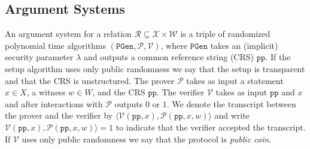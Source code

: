 \documentclass[11pt, lettersize, notitlepage, leqno, footskip=0.6cm]{article}
\newcommand{\bz}{\mathbb Z}
\newcommand{\bFp}{\mathbb{F}_p}
\newcommand{\ttt}{\texttt}
\newcommand{\mc}{\mathcal}
\newcommand{\mbf}{\mathbf}
\newcommand{\mr}{\mathrm}
\newcommand{\Jac}{\mr{Jac}}
\newcommand{\lam}{\lambda}
\newcommand{\sub}{\subseteq}
\newcommand{\mP}{\mc{P}}
\newcommand{\V}{\mc{V}}
\newcommand{\noin}{\noindent}
\newcommand{\Mod}[1]{\ (\mathrm{mod}\ #1)}
\numberwithin{equation}{section}
\begin{document}
\begin{comment}
\noin 3. \textbf{Jacobians:} Recently, the group of $\bFp$-valued points of the Jacobian of a genus three hyperelliptic curve over a prime field $\bFp$ has been proposed as a candidate (\hyperlink{DGS20}{[DGS20]}). While this idea needs more scrutiny, it seems promising because of the transparent setup, the smaller key sizes and the fact that the group operations are 28 times faster than those in class groups for the same level of security.

For an irreducible polynomial $f(X)\in \bz[X]$ of degree $7$ with Galois group $\mbf{S}_7$ and a prime $p$ such that $f(X)\Mod{p}$ is separable, the hyperelliptic curve $C:Y^2 = f(X)$ over $\bFp$ yields a Jacobian that is resistant to the known attacks. At the moment, such a genus three hyperelliptic Jacobian over a prime field $\bFp$ of bit-size $1100$ allows for a security level of $128$-bits. This group $\Jac(C)(\bFp)$ is roughly of size $p^3$.

Unfortunately, the adaptive root assumption fails in the group $\Jac(C)(\bFp)$. However, the group obtained by replacing it by an appropriate quotient group appears to satisfy the adaptive root assumption and the weaker assumptions such as the fractional root and low order assumptions. 

\end{comment}

\subsection{\fontsize{11}{11}\selectfont Argument Systems }


An argument system for a relation $\mc{R}\sub \mc{X} \times \mc{W}$ is a triple of randomized polynomial time algorithms $(\ttt{PGen}, \mP, \V)$, where $\ttt{PGen}$ takes an (implicit) security parameter $\lam$ and outputs a common reference string (CRS) $\ttt{pp}$. If the setup algorithm uses only public randomness we say that the setup is transparent and that the CRS is unstructured. The prover $\mP$ takes as input a statement $x \in X$, a witness $w \in W$, and the CRS $\ttt{pp}$. The verifier $\V$ takes as input $\ttt{pp}$ and $x$ and after interactions with $\mP$ outputs $0$ or $1$. We denote the transcript between the prover and the verifier by $\langle\V(\ttt{pp}, x),\mP(\ttt{pp}, x, w)\rangle$ and write $\V(\ttt{pp}, x), \mP(\ttt{pp}, x, w)\rangle = 1$ to indicate that the verifier accepted the transcript. If $\V$ uses only public randomness we say that the protocol is \textit{public coin}.
\end{document}
